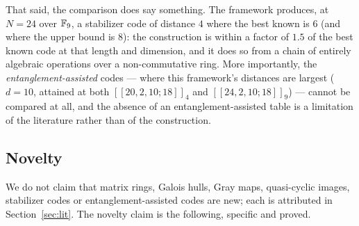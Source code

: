 That said, the comparison does say something. The framework produces, at
$N=24$ over $\mathbb F_9$, a stabilizer code of distance $4$ where the best known is
$6$ (and where the upper bound is $8$): the construction is within a factor of
$1.5$ of the best known code at that length and dimension, and it does so from a
chain of entirely algebraic operations over a non-commutative ring. More
importantly, the \emph{entanglement-assisted} codes --- where this framework's
distances are largest ($d=10$, attained at both $[[20,2,10;18]]_4$ and
$[[24,2,10;18]]_9$) --- cannot be compared at all, and the
absence of an entanglement-assisted table is a limitation of the literature
rather than of the construction.

\subsection{Novelty}

We do not claim that matrix rings, Galois hulls, Gray maps, quasi-cyclic images,
stabilizer codes or entanglement-assisted codes are new; each is attributed in
Section~\ref{sec:lit}. The novelty claim is the following, specific and proved.

